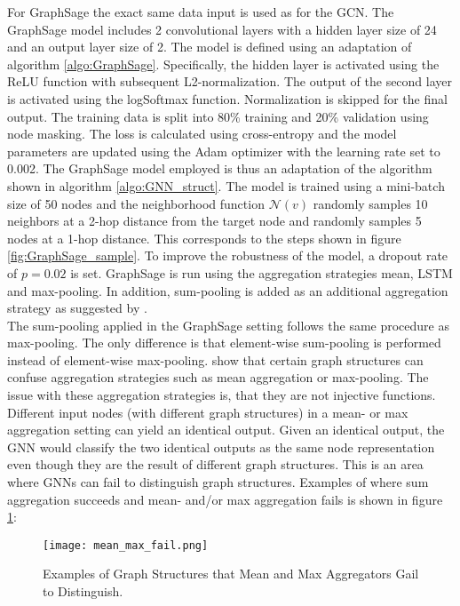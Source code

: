   For GraphSage the exact same data input is used as for the GCN. The 
  GraphSage model includes 2 convolutional layers with a hidden layer size of
  24 and an output layer size of 2. The model is defined using an adaptation of 
  algorithm \ref{algo:GraphSage}. Specifically, the hidden layer is activated 
  using the ReLU function with subsequent L2-normalization. The output of the 
  second layer is activated using the logSoftmax function. Normalization is 
  skipped for the final output. The training data is split into 80\% training 
  and 20\% validation using node masking. The loss is calculated using 
  cross-entropy and the model parameters are updated using the Adam optimizer 
  with the learning rate set to 0.002. The GraphSage model employed is thus an
  adaptation of the algorithm shown in algorithm \ref{algo:GNN_struct}. The 
  model is trained using a mini-batch size of 50 nodes and the neighborhood 
  function $\mathcal{N}(v)$ randomly samples 10 neighbors at a 2-hop distance
  from the target node and randomly samples 5 nodes at a 1-hop distance. This 
  corresponds to the steps shown in figure \ref{fig:GraphSage_sample}. To 
  improve the robustness of the model, a dropout rate of $p = 0.02$ is set. 
  GraphSage is run using the aggregation strategies mean, LSTM and max-pooling. 
  In addition, sum-pooling is added as an additional aggregation strategy 
  as suggested by \cite{xu2019powerful}. \\

  \noindent The sum-pooling applied in the GraphSage setting follows 
  the same procedure as max-pooling. The only difference is that element-wise 
  sum-pooling is performed instead of element-wise max-pooling. 
  \cite{xu2019powerful} show that certain graph structures can confuse 
  aggregation strategies such as mean aggregation or max-pooling. The issue with 
  these aggregation strategies is, that they are not injective functions. 
  Different input nodes (with different graph structures) in a mean- or 
  max aggregation setting can yield an identical output. Given an 
  identical output, the GNN would classify the two identical outputs as the 
  same node representation even though they are the result of different graph
  structures. This is an area where GNNs can fail to distinguish graph structures. 
  Examples of where sum aggregation succeeds and mean- and/or max aggregation 
  fails is shown in figure \ref{fig:graph_structures}:

  \begin{figure}[h]
		\centering
		\texttt{[image: mean\_max\_fail.png]}
		\caption{Examples of Graph Structures that Mean and Max Aggregators 
        Gail to Distinguish.}
        \label{fig:graph_structures}
        \cite[p. 6]{xu2019powerful}
  \end{figure}

